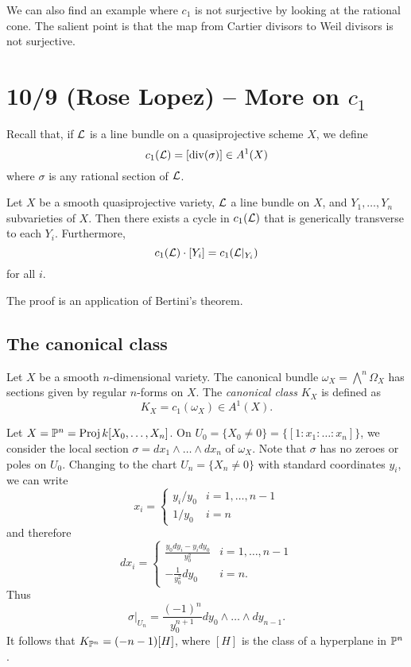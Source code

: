 \documentclass{article}
\begin{document}
\begin{ex}
	We can also find an example where $c_1$ is not surjective by looking at the rational cone.
	The salient point is that the map from Cartier divisors to Weil divisors is not surjective.
\end{ex}

\section{10/9 (Rose Lopez) -- More on $c_1$}

Recall that, if $\mathcal{L}$ is a line bundle on a quasiprojective scheme $X$, we define
\[
	c_1(\mathcal{L}) = [\operatorname{div}(\sigma)] \in A^1(X)
\]
where $\sigma$ is any rational section of $\mathcal{L}$.

\begin{prop}
	Let $X$ be a smooth quasiprojective variety, $\mathcal{L}$ a line bundle on $X$, and $Y_1, \dots, Y_n$ subvarieties of $X$.
	Then there exists a cycle in $c_1(\mathcal{L})$ that is generically transverse to each $Y_i$.
	Furthermore,
	\[
		c_1(\mathcal{L}) \cdot [Y_i] = c_1(\mathcal{L}|_{Y_i})
	\]
	for all $i$.
\end{prop}

The proof is an application of Bertini's theorem.

\subsection{The canonical class}

Let $X$ be a smooth $n$-dimensional variety.
The canonical bundle $\omega_X = \bigwedge^n \Omega_X$ has sections given by regular $n$-forms on $X$.
The \emph{canonical class} $K_X$ is defined as
\[
	K_X = c_1(\omega_X) \in A^1(X).
\]

\begin{ex}
	Let $X = \mathbb{P}^n = \operatorname{Proj} k[X_0, \dots, X_n]$.
	On $U_0 = \{ X_0 \neq 0 \} = \{ [1 : x_1 : \dots : x_n] \}$, we consider the local section $\sigma = dx_1 \wedge \dots \wedge dx_n$ of $\omega_X$.
	Note that $\sigma$ has no zeroes or poles on $U_0$.
	Changing to the chart $U_n = \{ X_n \neq 0 \}$ with standard coordinates $y_i$, we can write
	\[
		x_i = \begin{cases}
			y_i / y_0 & i = 1, \dots, n-1 \\
			1 / y_0 & i = n
		\end{cases}
	\]
	and therefore
	\[
		dx_i = \begin{cases}
			\frac{y_0 dy_i - y_i dy_0}{y_0^2} & i = 1, \dots, n-1 \\
			-\frac{1}{y_0^2} dy_0 & i = n.
		\end{cases}
	\]
	Thus
	\[
		\sigma|_{U_n} = \frac{(-1)^n}{y_0^{n+1}} dy_0 \wedge \dots \wedge dy_{n-1}.
	\]
	It follows that $K_{\mathbb{P}^n} = (-n-1) [H]$, where $[H]$ is the class of a hyperplane in $\mathbb{P}^n$.
\end{ex}
\end{document}
